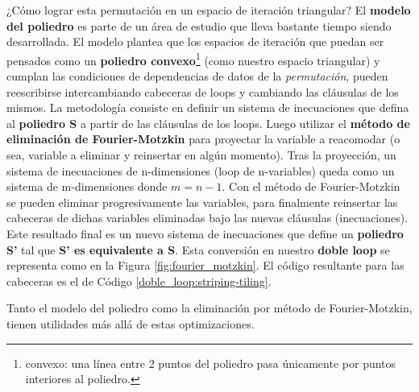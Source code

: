 \documentclass{article}
\begin{document}
¿Cómo lograr esta permutación en un espacio de iteración triangular? El \textbf{modelo del poliedro} es parte
de un área de estudio que lleva bastante tiempo siendo desarrollada. El modelo plantea que los espacios
de iteración que puedan ser pensados como un \textbf{poliedro convexo}\footnote{convexo: una línea entre 2 puntos
del poliedro pasa únicamente por puntos interiores al poliedro.} (como nuestro espacio triangular) y cumplan las condiciones de dependencias
de datos de la \textit{permutación}, pueden reescribirse intercambiando cabeceras de loops y cambiando las cláusulas de los mismos.
La metodología consiste en
definir un sistema de inecuaciones que defina al \textbf{poliedro S} a partir de las cláusulas de los loops. Luego utilizar
el \textbf{método de eliminación de Fourier-Motzkin} para proyectar la variable a reacomodar (o sea, variable a eliminar y
reinsertar en algún momento). Tras la proyección, un sistema de inecuaciones de n-dimensiones (loop de n-variables)
queda como un sistema de m-dimensiones donde $m=n-1$. Con el método de Fourier-Motzkin se pueden eliminar progresivamente las variables,
para finalmente reinsertar las cabeceras de dichas variables eliminadas bajo las nuevas cláusulas (inecuaciones). Este resultado
final es un nuevo sistema de inecuaciones que define un \textbf{poliedro S'} tal que \textbf{S' es equivalente a S}.
Esta conversión en nuestro \textbf{doble loop} se representa como en la Figura \ref{fig:fourier_motzkin}. El código
resultante para las cabeceras es el de Código \ref{doble_loop:striping-tiling}.


Tanto el modelo del poliedro como la eliminación por método de Fourier-Motzkin, tienen utilidades más allá
de estas optimizaciones.
\end{document}
